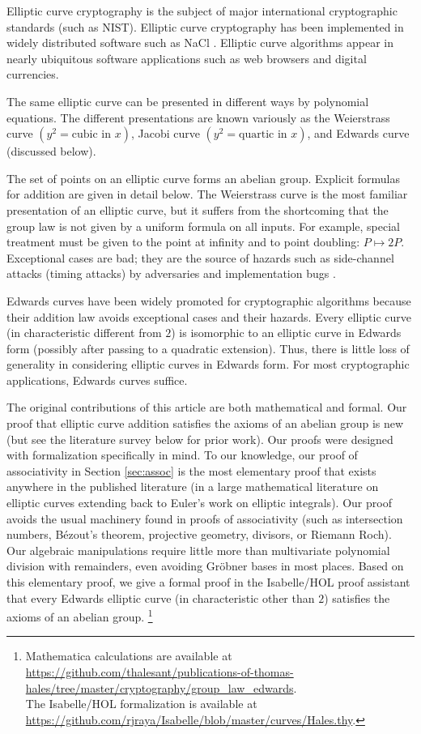 \documentclass{llncs}
\begin{document}
Elliptic curve cryptography is the subject of major international
cryptographic standards (such as NIST).  Elliptic curve cryptography
has been implemented in widely distributed software such as NaCl
\cite{bernstein2012security}.  Elliptic curve algorithms appear in
nearly ubiquitous software applications such as web browsers and
digital currencies.

The same elliptic curve can be presented in different ways by
polynomial equations.  The different presentations are known variously
as the Weierstrass curve $(y^2 = \text{cubic in } x)$, Jacobi curve
$(y^2 = \text{quartic in } x)$, and Edwards curve (discussed below).

The set of points on an elliptic curve forms an abelian group.  Explicit
formulas for addition are given in detail below.  The Weierstrass
curve is the most familiar presentation of an elliptic curve, but it
suffers from the shortcoming that the group law is not given by a
uniform formula on all inputs.  For example, special treatment must be
given to the point at infinity and to point doubling: $P
\mapsto 2P$.  Exceptional cases are bad; they are the source of 
hazards such as side-channel attacks (timing attacks) by
adversaries and implementation bugs \cite{brier2002weierstrass}.

Edwards curves have been widely promoted for cryptographic algorithms
because their addition law avoids exceptional cases and their hazards.
Every elliptic curve (in characteristic different from $2$) is
isomorphic to an elliptic curve in Edwards form (possibly after
passing to a quadratic extension).  Thus, there is little loss of
generality in considering elliptic curves in Edwards form.  For most
cryptographic applications, Edwards curves suffice.

The original contributions of this article are both mathematical and
formal.  Our proof that elliptic curve addition satisfies the axioms
of an abelian group is new (but see the literature survey below for
prior work).  Our proofs were designed with formalization specifically
in mind.  To our knowledge, our proof of associativity in Section
\ref{sec:assoc} is the most elementary proof that exists anywhere in
the published literature (in a large mathematical literature on
elliptic curves extending back to Euler's work on elliptic integrals).
Our proof avoids the usual machinery found in proofs of associativity
(such as intersection numbers, B\'ezout's theorem, projective
geometry, divisors, or Riemann Roch).  Our algebraic manipulations
require little more than multivariate polynomial division with
remainders, even avoiding Gr\"obner bases in most places.  Based on
this elementary proof, we give a formal proof in the Isabelle/HOL
proof assistant that every Edwards elliptic curve (in characteristic
other than $2$) satisfies the axioms of an abelian group.%
%
\footnote{Mathematica calculations are available at\\
  \url{https://github.com/thalesant/publications-of-thomas-hales/tree/master/cryptography/group_law_edwards}.\\
  The Isabelle/HOL formalization is available at\\
  \url{https://github.com/rjraya/Isabelle/blob/master/curves/Hales.thy}.}
\end{document}
